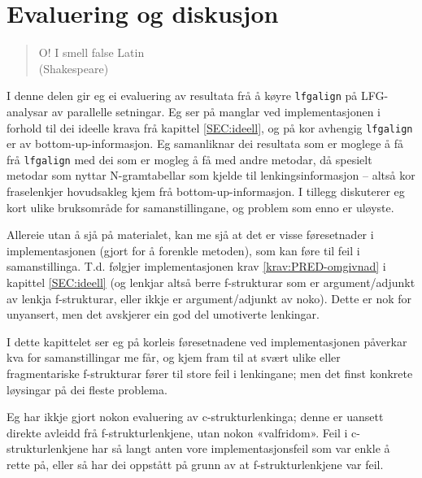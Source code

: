 \documentclass[12pt,a4paper,oneside,draft]{report}
\newcommand{\q}[2]{\begin{quotation}\raggedleft{}#1\\\vspace{0.2cm}(#2)\vspace{1.2cm}\end{quotation}}
\begin{document}
\chapter{Evaluering og diskusjon}
\label{sec-5}

\label{SEC:diskusjon}

  \q{O! I smell false Latin}
  {Shakespeare}
  
  
  

 I denne delen gir eg ei evaluering av resultata frå å køyre
 \texttt{lfgalign} på LFG-analysar av parallelle setningar. Eg ser på manglar
 ved implementasjonen i forhold til dei ideelle krava frå kapittel
 \ref{SEC:ideell}, og på kor avhengig \texttt{lfgalign} er av
 bottom-up-informasjon. Eg samanliknar dei resultata som er moglege å
 få frå \texttt{lfgalign} med dei som er mogleg å få med andre metodar, då
 spesielt metodar som nyttar N-gramtabellar som kjelde til
 lenkingsinformasjon -- altså kor fraselenkjer hovudsakleg kjem frå
 bottom-up-informasjon. I tillegg diskuterer eg kort ulike bruksområde
 for samanstillingane, og problem som enno er uløyste.

 Allereie utan å sjå på materialet, kan me sjå at det er visse
 føresetnader i implementasjonen (gjort for å forenkle metoden), som
 kan føre til feil i samanstillinga. T.d. følgjer implementasjonen
 krav \ref{krav:PRED-omgivnad} i kapittel \ref{SEC:ideell} (og lenkjar
 altså berre f\hyp{}strukturar som er argument/adjunkt av lenkja
 f\hyp{}strukturar, eller ikkje er argument/adjunkt av noko). Dette er nok
 for unyansert, men det avskjerer ein god del umotiverte lenkingar.

 I dette kapittelet ser eg på korleis føresetnadene ved
 implementasjonen påverkar kva for samanstillingar me får, og kjem
 fram til at svært ulike eller fragmentariske f\hyp{}strukturar fører til
 store feil i lenkingane; men det finst konkrete løysingar på dei
 fleste problema. 

 Eg har ikkje gjort nokon evaluering av c\hyp{}strukturlenkinga; denne er
 uansett direkte avleidd frå f\hyp{}strukturlenkjene, utan nokon
 «valfridom». Feil i c\hyp{}strukturlenkjene har så langt anten vore
 implementasjonsfeil som var enkle å rette på, eller så har dei
 oppstått på grunn av at f\hyp{}strukturlenkjene var feil.
 
\end{document}
